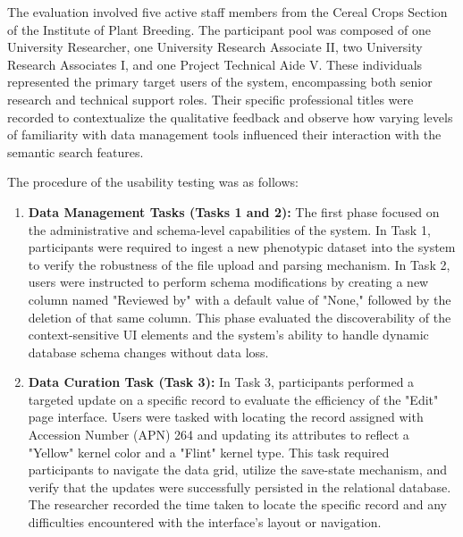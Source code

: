 \documentclass[journal]{./IEEE/IEEEtran}
\begin{document}
The evaluation involved five active staff members from the Cereal Crops Section of the Institute of Plant Breeding. The participant pool was composed of one University Researcher, one University Research Associate II, two University Research Associates I, and one Project Technical Aide V. These individuals represented the primary target users of the system, encompassing both senior research and technical support roles. Their specific professional titles were recorded to contextualize the qualitative feedback and observe how varying levels of familiarity with data management tools influenced their interaction with the semantic search features.

The procedure of the usability testing was as follows:
\begin{enumerate}
\item \textbf{Data Management Tasks (Tasks 1 and 2):} The first phase focused on the administrative and schema-level capabilities of the system. In Task 1, participants were required to ingest a new phenotypic dataset into the system to verify the robustness of the file upload and parsing mechanism. In Task 2, users were instructed to perform schema modifications by creating a new column named "Reviewed by" with a default value of "None," followed by the deletion of that same column. This phase evaluated the discoverability of the context-sensitive UI elements and the system's ability to handle dynamic database schema changes without data loss.

\item \textbf{Data Curation Task (Task 3):} In Task 3, participants performed a targeted update on a specific record to evaluate the efficiency of the "Edit" page interface. Users were tasked with locating the record assigned with Accession Number (APN) 264 and updating its attributes to reflect a "Yellow" kernel color and a "Flint" kernel type. This task required participants to navigate the data grid, utilize the save-state mechanism, and verify that the updates were successfully persisted in the relational database. The researcher recorded the time taken to locate the specific record and any difficulties encountered with the interface's layout or navigation.


\end{enumerate}
\end{document}
